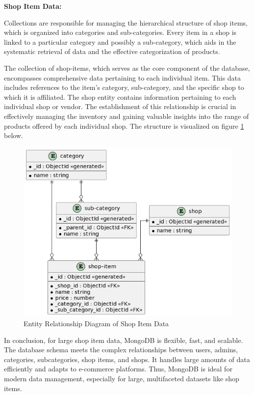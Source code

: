 \noindent\textbf{Shop Item Data:}

Collections are responsible for managing the hierarchical structure of shop items, which is organized into categories and sub-categories. Every item in a shop is linked to a particular category and possibly a sub-category, which aids in the systematic retrieval of data and the effective categorization of products.

The collection of shop-items, which serves as the core component of the database, encompasses comprehensive data pertaining to each individual item. This data includes references to the item's category, sub-category, and the specific shop to which it is affiliated. The shop entity contains information pertaining to each individual shop or vendor. The establishment of this relationship is crucial in effectively managing the inventory and gaining valuable insights into the range of products offered by each individual shop. The structure is visualized on figure \ref{fig:serd} below.

\begin{figure}[H]
	\centering
	\includegraphics[width=0.85\linewidth]{img/shop_items_erd.png}
	\caption{Entity Relationship Diagram of Shop Item Data}
	\label{fig:serd}
\end{figure}

In conclusion, for large shop item data, MongoDB is flexible, fast, and scalable. The database schema meets the complex relationships between users, admins, categories, subcategories, shop items, and shops. It handles large amounts of data efficiently and adapts to e-commerce platforms. Thus, MongoDB is ideal for modern data management, especially for large, multifaceted datasets like shop items.

